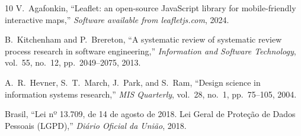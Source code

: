 \documentclass[lettersize,journal]{IEEEtran}
\begin{document}
\begin{thebibliography}{10}
V.~Agafonkin, ``Leaflet: an open-source JavaScript library for mobile-friendly interactive maps,'' \textit{Software available from leafletjs.com}, 2024.

B.~Kitchenham and P.~Brereton, ``A systematic review of systematic review process research in software engineering,'' \textit{Information and Software Technology}, vol.~55, no.~12, pp.~2049--2075, 2013.

A.~R.~Hevner, S.~T.~March, J.~Park, and S.~Ram, ``Design science in information systems research,'' \textit{MIS Quarterly}, vol.~28, no.~1, pp.~75--105, 2004.

Brasil, ``Lei nº 13.709, de 14 de agosto de 2018. Lei Geral de Proteção de Dados Pessoais (LGPD),'' \textit{Diário Oficial da União}, 2018.

\end{thebibliography}
\end{document}
